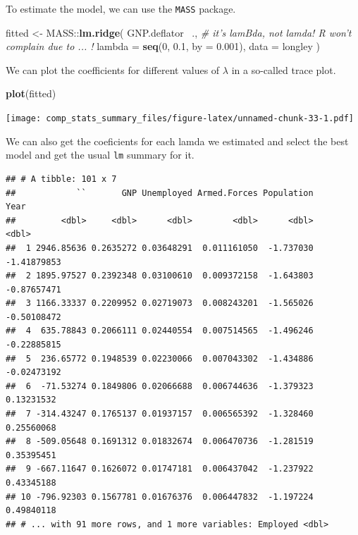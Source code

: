 \documentclass[]{book}
\newenvironment{Shaded}{\begin{snugshade}}{\end{snugshade}}
\newcommand{\KeywordTok}[1]{\textcolor[rgb]{0.13,0.29,0.53}{\textbf{{#1}}}}
\newcommand{\DataTypeTok}[1]{\textcolor[rgb]{0.13,0.29,0.53}{{#1}}}
\newcommand{\DecValTok}[1]{\textcolor[rgb]{0.00,0.00,0.81}{{#1}}}
\newcommand{\FloatTok}[1]{\textcolor[rgb]{0.00,0.00,0.81}{{#1}}}
\newcommand{\StringTok}[1]{\textcolor[rgb]{0.31,0.60,0.02}{{#1}}}
\newcommand{\CommentTok}[1]{\textcolor[rgb]{0.56,0.35,0.01}{\textit{{#1}}}}
\newcommand{\NormalTok}[1]{{#1}}
\begin{document}
To estimate the model, we can use the \texttt{MASS} package.

\begin{Shaded}
\begin{Highlighting}[]
\NormalTok{fitted <-}\StringTok{ }\NormalTok{MASS::}\KeywordTok{lm.ridge}\NormalTok{(}
  \NormalTok{GNP.deflator ~., }
  \CommentTok{# it's lamBda, not lamda! R won't complain due to ... !}
  \DataTypeTok{lambda =} \KeywordTok{seq}\NormalTok{(}\DecValTok{0}\NormalTok{, }\FloatTok{0.1}\NormalTok{, }\DataTypeTok{by =} \FloatTok{0.001}\NormalTok{), }
  \DataTypeTok{data =} \NormalTok{longley}
\NormalTok{)}
\end{Highlighting}
\end{Shaded}

We can plot the coefficients for different values of \(\lambda\) in a
so-called trace plot.

\begin{Shaded}
\begin{Highlighting}[]
\KeywordTok{plot}\NormalTok{(fitted)}
\end{Highlighting}
\end{Shaded}

\texttt{[image: comp\_stats\_summary\_files/figure-latex/unnamed-chunk-33-1.pdf]}

We can also get the coeficients for each lamda we estimated and select
the best model and get the usual \texttt{lm} summary for it.

\begin{Shaded}
\end{Shaded}

\begin{verbatim}
## # A tibble: 101 x 7
##            ``       GNP Unemployed Armed.Forces Population        Year
##         <dbl>     <dbl>      <dbl>        <dbl>      <dbl>       <dbl>
##  1 2946.85636 0.2635272 0.03648291  0.011161050  -1.737030 -1.41879853
##  2 1895.97527 0.2392348 0.03100610  0.009372158  -1.643803 -0.87657471
##  3 1166.33337 0.2209952 0.02719073  0.008243201  -1.565026 -0.50108472
##  4  635.78843 0.2066111 0.02440554  0.007514565  -1.496246 -0.22885815
##  5  236.65772 0.1948539 0.02230066  0.007043302  -1.434886 -0.02473192
##  6  -71.53274 0.1849806 0.02066688  0.006744636  -1.379323  0.13231532
##  7 -314.43247 0.1765137 0.01937157  0.006565392  -1.328460  0.25560068
##  8 -509.05648 0.1691312 0.01832674  0.006470736  -1.281519  0.35395451
##  9 -667.11647 0.1626072 0.01747181  0.006437042  -1.237922  0.43345188
## 10 -796.92303 0.1567781 0.01676376  0.006447832  -1.197224  0.49840118
## # ... with 91 more rows, and 1 more variables: Employed <dbl>
\end{verbatim}
\end{document}
